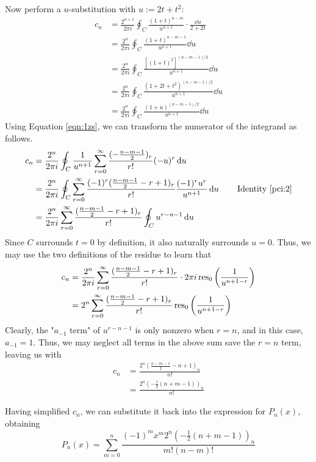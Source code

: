 \documentclass[titlepage]{article}
\numberwithin{equation}{section}
\begin{document}
Now perform a $u$-substitution with $u:=2t+t^2$:
\begin{align*}
    c_n &= \frac{2^{n+1}}{2\pi i}\oint_C\frac{(1+t)^{n-m}}{u^{n+1}}\cdot\frac{\dd{u}}{2+2t}\\
    &= \frac{2^n}{2\pi i}\oint_C\frac{(1+t)^{n-m-1}}{u^{n+1}}\dd{u}\\
    &= \frac{2^n}{2\pi i}\oint_C\frac{[(1+t)^2]^{(n-m-1)/2}}{u^{n+1}}\dd{u}\\
    &= \frac{2^n}{2\pi i}\oint_C\frac{(1+2t+t^2)^{(n-m-1)/2}}{u^{n+1}}\dd{u}\\
    &= \frac{2^n}{2\pi i}\oint_C\frac{(1+u)^{(n-m-1)/2}}{u^{n+1}}\dd{u}
\end{align*}
Using Equation \ref{eqn:1zs}, we can transform the numerator of the integrand as follows.
\begin{align*}
    c_n &= \frac{2^n}{2\pi i}\oint_C\frac{1}{u^{n+1}}\sum_{r=0}^\infty\frac{(-\tfrac{n-m-1}{2})_r}{r!}(-u)^r\dd{u}\\
    &= \frac{2^n}{2\pi i}\oint_C\sum_{r=0}^\infty\frac{(-1)^r(\tfrac{n-m-1}{2}-r+1)_r}{r!}\frac{(-1)^ru^r}{u^{n+1}}\dd{u}\tag*{Identity \ref{pci:2}}\\
    &= \frac{2^n}{2\pi i}\sum_{r=0}^\infty\frac{(\tfrac{n-m-1}{2}-r+1)_r}{r!}\oint_Cu^{r-n-1}\dd{u}
\end{align*}
Since $C$ surrounds $t=0$ by definition, it also naturally surrounds $u=0$. Thus, we may use the two definitions of the residue to learn that
\begin{align*}
    c_n &= \frac{2^n}{2\pi i}\sum_{r=0}^\infty\frac{(\tfrac{n-m-1}{2}-r+1)_r}{r!}\cdot 2\pi i\operatorname{res}_0\left( \frac{1}{u^{n+1-r}} \right)\\
    &= 2^n\sum_{r=0}^\infty\frac{(\tfrac{n-m-1}{2}-r+1)_r}{r!}\operatorname{res}_0\left( \frac{1}{u^{n+1-r}} \right)
\end{align*}
Clearly, the "$a_{-1}$ term" of $u^{r-n-1}$ is only nonzero when $r=n$, and in this case, $a_{-1}=1$.
Thus, we may neglect all terms in the above sum save the $r=n$ term, leaving us with
\begin{align*}
    c_n &= \frac{2^n(\tfrac{n-m-1}{2}-n+1)_n}{n!}\\
    &= \frac{2^n\left( -\tfrac{1}{2}(n+m-1) \right)_n}{n!}
\end{align*}\par
Having simplified $c_n$, we can substitute it back into the expression for $P_n(x)$, obtaining
\begin{equation*}
    P_n(x) = \sum_{m=0}^n\frac{(-1)^mx^m2^n\left( -\tfrac{1}{2}(n+m-1) \right)_n}{m!(n-m)!}
\end{equation*}
\end{document}
